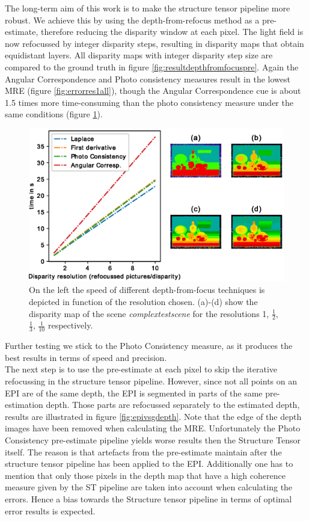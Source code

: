 \documentclass  [
  paper    = a4,
  BCOR     = 10mm,
  twoside,
  fontsize = 12pt,
  fleqn,
  toc      = bibnumbered,
  toc      = listofnumbered,
  numbers  = noendperiod,
  headings = normal,
  listof   = leveldown,
  version  = 3.03
]                                       {scrreprt}
\begin{document}
	
	The long-term aim of this work is to make the structure tensor pipeline more robust. We achieve this by using the depth-from-refocus method as a pre-estimate, therefore reducing the disparity window at each pixel. The light field is now refocussed by integer disparity steps, resulting in disparity maps that obtain equidistant layers.
	 All disparity maps with integer disparity step size are compared to the ground truth in figure \ref{fig:resultdepthfromfocuspre}. Again the Angular Correspondence and Photo consistency measures result in the lowest MRE (figure \ref{fig:errorres1all}), though the Angular Correspondence cue is about 1.5 times more time-consuming than the photo consistency measure under the same conditions (figure \ref{fig:speeds}).
	 \begin{figure}
	 	\centering
	 	\includegraphics[width=0.7\linewidth]{images/speeds.eps}
	 	\caption[Speed of different depth-from-focus techniques]{ On the left the speed of different depth-from-focus techniques is depicted in function of the resolution chosen. (a)-(d) show the disparity map of the scene \textit{complextestscene} for the resolutions 1, $\frac{1}{2}$, $\frac{1}{3}$, $\frac{1}{10}$ respectively.}
	 	\label{fig:speeds}
	 \end{figure}
 	Further testing we stick to the Photo Consistency measure, as it produces the best results in terms of speed and precision.\\
 	The next step is to use the pre-estimate at each pixel to skip the iterative refocussing in the structure tensor pipeline. However, since not all points on an EPI are of the same depth, the EPI is segmented in parts of the same pre-estimation depth. Those parts are refocussed separately to the estimated depth, results are illustrated in figure \ref{fig:epivsgdepth}. Note that the edge of the depth images have been removed when calculating the MRE. 
 	Unfortunately the Photo Consistency pre-estimate pipeline yields worse results then the Structure Tensor itself. The reason is that artefacts from the pre-estimate maintain after the structure tensor pipeline has been applied to the EPI. Additionally one has to mention that only those pixels in the depth map that have a high coherence measure given by the ST pipeline are taken into account when calculating the errors. Hence a bias towards the Structure tensor pipeline in terms of optimal error results is expected. \\
\end{document}
